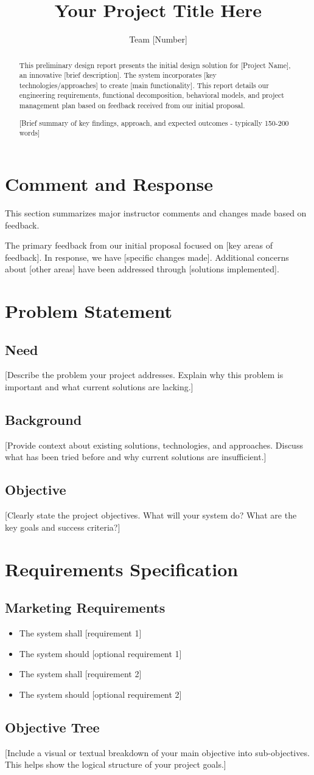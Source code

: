 \documentclass[final]{../designreport}
\title{Your Project Title Here}
\author{Team [Number]}
\newcommand{\commentresponse}{%
    \section{Comment and Response}
    This section summarizes major instructor comments and changes made based on feedback.
}
\newcommand{\needsstatement}{%
    \section{Problem Statement}
    \subsection{Need}
}
\newcommand{\background}{\subsection{Background}}
\newcommand{\objective}{\subsection{Objective}}
\newcommand{\requirementsspec}{\section{Requirements Specification}}
\newcommand{\marketingreqs}{\subsection{Marketing Requirements}}
\newcommand{\objectivetree}{\subsection{Objective Tree}}
\begin{document}
\maketitle

\makefrontmatter

\begin{abstract}
This preliminary design report presents the initial design solution for [Project Name], an innovative [brief description]. The system incorporates [key technologies/approaches] to create [main functionality]. This report details our engineering requirements, functional decomposition, behavioral models, and project management plan based on feedback received from our initial proposal.

[Brief summary of key findings, approach, and expected outcomes - typically 150-200 words]
\end{abstract}

\commentresponse
The primary feedback from our initial proposal focused on [key areas of feedback]. In response, we have [specific changes made]. Additional concerns about [other areas] have been addressed through [solutions implemented].

\needsstatement
[Describe the problem your project addresses. Explain why this problem is important and what current solutions are lacking.]

\background
[Provide context about existing solutions, technologies, and approaches. Discuss what has been tried before and why current solutions are insufficient.]

\objective
[Clearly state the project objectives. What will your system do? What are the key goals and success criteria?]

\requirementsspec

\marketingreqs
\begin{itemize}
    \item The system shall [requirement 1]
    \item The system should [optional requirement 1]
    \item The system shall [requirement 2]
    \item The system should [optional requirement 2]
\end{itemize}

\objectivetree
[Include a visual or textual breakdown of your main objective into sub-objectives. This helps show the logical structure of your project goals.]
\end{document}
